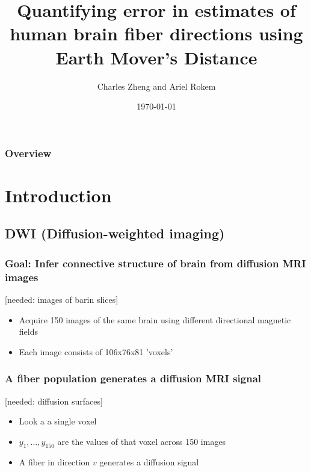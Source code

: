 \documentclass{beamer}
\title[Application of EMD to DWI]{Quantifying error in estimates of human brain fiber
directions using Earth Mover’s Distance}
\author{Charles Zheng and Ariel Rokem} %
\institute[Stanford] %
{
Stanford University \\
Joint with Franco Pestilli, Indiana University\\ %
}
\date{\today} %
\begin{document}
\begin{frame}
\titlepage %
\end{frame}

\begin{frame}
\frametitle{Overview} %
\tableofcontents %
\end{frame}


\section{Introduction} %

\subsection{DWI (Diffusion-weighted imaging)}

\begin{frame}
\frametitle{Goal: Infer connective structure of brain from diffusion MRI images}
[needed: images of barin slices]
\begin{itemize}
\item Acquire 150 images of the same brain using different directional magnetic fields
\item Each image consists of 106x76x81 'voxels'
\end{itemize}
\end{frame}

\begin{frame}
\frametitle{A fiber population generates a diffusion MRI signal}
[needed: diffusion surfaces]
\begin{itemize}
\item Look a a single voxel
\item $y_1,\hdots,y_{150}$ are the values of that voxel across 150 images
\item A fiber in direction $v$ generates a diffusion signal
\end{itemize}
\end{frame}
\end{document}
